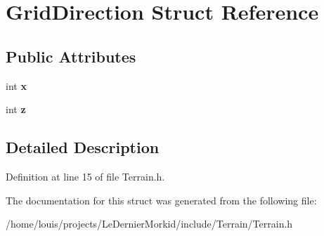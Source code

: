\hypertarget{struct_grid_direction}{}\section{Grid\+Direction Struct Reference}
\label{struct_grid_direction}
\subsection*{Public Attributes}
\begin{DoxyCompactItemize}
\item 
\mbox{\label{struct_grid_direction_a290ac1961ef3d29c634d482c235f86de}} 
int {\bfseries x}
\item 
\mbox{\label{struct_grid_direction_afb0df84ade3f8e9b6b0adec5b7294c32}} 
int {\bfseries z}
\end{DoxyCompactItemize}


\subsection{Detailed Description}


Definition at line 15 of file Terrain.\+h.



The documentation for this struct was generated from the following file\+:\begin{DoxyCompactItemize}
\item 
/home/louis/projects/\+Le\+Dernier\+Morkid/include/\+Terrain/Terrain.\+h\end{DoxyCompactItemize}
